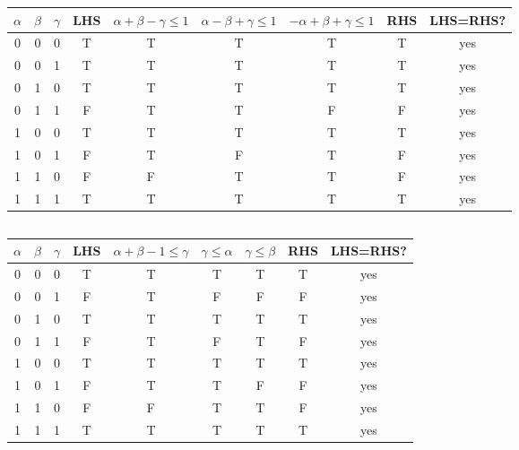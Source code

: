 \documentclass{article}
\begin{document}
\begin{table}[H]
    \centering
    \renewcommand{\arraystretch}{1.3}
    \begin{tabular}{|c|c|c|c|c|c|c|c|c|}
        \hline
        $\alpha$ & $\beta$ & $\gamma$ & LHS & $\alpha+\beta-\gamma\le 1$ & $\alpha-\beta+\gamma\le 1$ & $-\alpha+\beta+\gamma\le 1$ & RHS & LHS=RHS? \\
        \hline
        0 & 0 & 0 & T & T & T & T & T & yes \\
        \hline
        0 & 0 & 1 & T & T & T & T & T & yes \\
        \hline
        0 & 1 & 0 & T & T & T & T & T & yes \\
        \hline
        0 & 1 & 1 & F & T & T & F & F & yes \\
        \hline
        1 & 0 & 0 & T & T & T & T & T & yes \\
        \hline
        1 & 0 & 1 & F & T & F & T & F & yes \\
        \hline
        1 & 1 & 0 & F & F & T & T & F & yes \\
        \hline
        1 & 1 & 1 & T & T & T & T & T & yes \\
        \hline
    \end{tabular}
\end{table}
\subsection{}

\begin{table}[H]
    \centering
    \renewcommand{\arraystretch}{1.3}
    \begin{tabular}{|c|c|c|c|c|c|c|c|c|}
        \hline
        $\alpha$ & $\beta$ & $\gamma$ & LHS & $\alpha+\beta-1\le\gamma$ & $\gamma\le\alpha$ & $\gamma\le\beta$ & RHS & LHS=RHS? \\
        \hline
        0 & 0 & 0 & T & T & T & T & T &  yes\\
        \hline
        0 & 0 & 1 & F & T & F & F & F &  yes\\
        \hline
        0 & 1 & 0 & T & T & T & T & T &  yes\\
        \hline
        0 & 1 & 1 & F & T & F & T & F &  yes\\
        \hline
        1 & 0 & 0 & T & T & T & T & T &  yes\\
        \hline
        1 & 0 & 1 & F & T & T & F & F &  yes\\
        \hline
        1 & 1 & 0 & F & F & T & T & F &  yes\\
        \hline
        1 & 1 & 1 & T & T & T & T & T & yes \\
        \hline
    \end{tabular}
\end{table}
\end{document}
